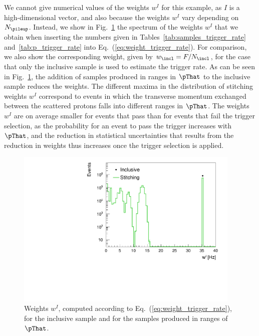 We cannot give numerical values of the weights $w^{I}$ for this example,
as $I$ is a high-dimensional vector, and also because the weights $w^{I}$ vary depending on $N_{\pileup}$.
Instead, we show in Fig.~\ref{fig:weight_trigger_rate} the spectrum of the weights $w^{I}$
that we obtain when inserting the numbers given in Tables~\ref{tab:samples_trigger_rate} and~\ref{tab:p_trigger_rate} into Eq.~(\ref{eq:weight_trigger_rate}).
For comparison, we also show the corresponding weight, given by $w_{\incl} = F/N_{\incl}$,
for the case that only the inclusive sample is used to estimate the trigger rate.
As can be seen in Fig.~\ref{fig:weight_trigger_rate}, the addition of samples produced in ranges in $\pThat$ to the inclusive sample reduces the weights.
The different maxima in the distribution of stitching weights $w^{I}$ correspond to events 
in which the transverse momentum exchanged between the scattered protons falls into different ranges in $\pThat$.
The weights $w^{I}$ are on average smaller for events that pass than for events that fail the trigger selection,
as the probability for an event to pass the trigger increases with $\pThat$,
and the reduction in statistical uncertainties that results from the reduction in weights thus increases once the trigger selection is applied.

\begin{figure}
\setlength{\unitlength}{1mm}
\begin{center}
\includegraphics*[height=76mm]{plots/makeEvtWeightPlotsForPaper_evtWeight_log.pdf}
\end{center}
\caption{
  Weights $w^{I}$, computed according to Eq.~(\ref{eq:weight_trigger_rate}), 
  for the inclusive sample and for the samples produced in ranges of $\pThat$.
}
\label{fig:weight_trigger_rate}
\end{figure}

